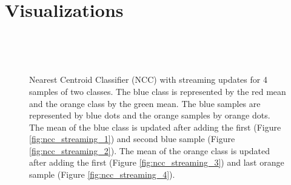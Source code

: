 \appendix
\chapter{Visualizations}

\begin{figure}[h]
  \centering
  \begin{minipage}{.45\textwidth}
  \centering
    
    \label{fig:ncc_streaming_0}
  \end{minipage}
  \hfill
  \begin{minipage}{.45\textwidth}
  \centering
    
    \label{fig:ncc_streaming_1}
  \end{minipage}\\
  \begin{minipage}{.45\textwidth}
  \centering
    
    \label{fig:ncc_streaming_2}
  \end{minipage}
  \hfill
  \begin{minipage}{.45\textwidth}
  \centering
    
    \label{fig:ncc_streaming_3}
  \end{minipage}\\
  \begin{minipage}{.45\textwidth}
  \centering
    
    \label{fig:ncc_streaming_4}
  \end{minipage}
  \caption{Nearest Centroid Classifier (NCC) with streaming updates for 4 samples of two classes. The blue class is represented by the red mean and the orange class by the green mean. The blue samples are represented by blue dots and the orange samples by orange dots. The mean of the blue class is updated after adding the first (Figure \ref{fig:ncc_streaming_1}) and second blue sample (Figure \ref{fig:ncc_streaming_2}). The mean of the orange class is updated after adding the first (Figure \ref{fig:ncc_streaming_3}) and last orange sample (Figure \ref{fig:ncc_streaming_4}).}
  \label{fig:ncc_batched_streaming}
\end{figure}

